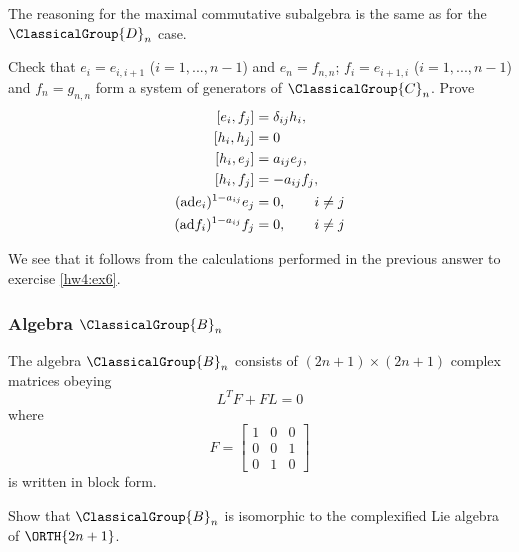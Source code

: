 \answer The reasoning for the maximal commutative subalgebra is
the same as for the $\ClassicalGroup{D}_{n}$ case.

\begin{exercise}
Check that $e_{i}=e_{i,i+1}$ ($i=1,...,n-1$) and $e_{n}=f_{n,n}$;
$f_{i}=e_{i+1,i}$ ($i=1,...,n-1$) and $f_{n}=g_{n,n}$ form a
system of generators of $\ClassicalGroup{C}_{n}$. Prove
\begin{subequations}
\begin{align}
[e_{i},f_{j}]&=\delta_{ij}h_{i},\\
[h_{i},h_{j}]&=0\\
[h_{i},e_{j}]&=a_{ij}e_{j},\\
[h_{i},f_{j}]&=-a_{ij}f_{j},\\
({\rm ad}e_{i})^{1-a_{ij}}e_{j}&=0,\qquad i\not=j \\
({\rm ad}f_{i})^{1-a_{ij}}f_{j}&=0,\qquad i\not=j
\end{align}
\end{subequations}
\end{exercise}
\answer We see that it follows from the calculations performed in
the previous answer to exercise \ref{hw4:ex6}.
\subsubsection{Algebra \texorpdfstring{$\ClassicalGroup{B}_{n}$}{Bn}}

The algebra $\ClassicalGroup{B}_{n}$ consists of $(2n+1)\times(2n+1)$ complex
matrices obeying
\begin{equation}
L^{T}F+FL=0
\end{equation}
where
\begin{equation}
F=\begin{bmatrix}1&0&0\\
0&0&1\\
0&1&0
\end{bmatrix}
\end{equation}
is written in block form.

\begin{exercise}
Show that $\ClassicalGroup{B}_{n}$ is isomorphic to the complexified Lie algebra of $\ORTH{2n+1}$.
\end{exercise}

